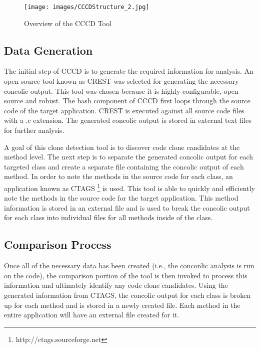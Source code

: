 \documentclass[conference]{IEEEtran}
\begin{document}
\begin{figure}[thb!]
\centering
\texttt{[image: images/CCCDStructure\_2.jpg]}
\caption{Overview of the CCCD Tool}
\label{fig:cccdstructure}
\end{figure}



\subsection*{Data Generation}
The initial step of CCCD is to generate the required information for analysis. An open source tool known as CREST was selected for generating the necessary concolic output. This tool was chosen because it is highly configurable, open source and robust. The bash component of CCCD first loops through the source code of the target application. CREST is executed against all source code files with a .c extension. The generated concolic output is stored in external text files for further analysis. 

A goal of this clone detection tool is to discover code clone candidates at the method level. The next step is to separate the generated concolic output for each targeted class and create a separate file containing the concolic output of each method. In order to note the methods in the source code for each class, an application known as CTAGS \footnote{http://ctags.sourceforge.net} is used. This tool is able to quickly and efficiently note the methods in the source code for the target application. This method information is stored in an external file and is used to break the concolic output for each class into individual files for all methods inside of the class. 


\subsection*{Comparison Process}

Once all of the necessary data has been created (i.e., the conconlic analysis is run on the code), the comparison portion of the tool is then invoked to process this information and ultimately identify any code clone candidates. Using the generated information from CTAGS, the concolic output for each class is broken up for each method and is stored in a newly created file. Each method in the entire application will have an external file created for it.
\end{document}
